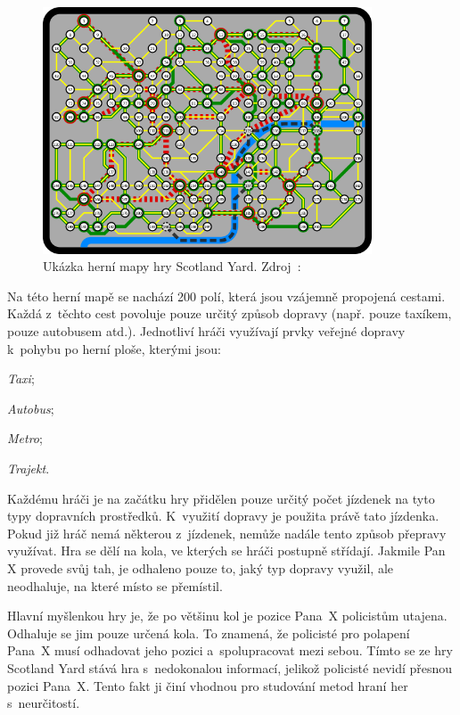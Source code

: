 \begin{figure}[H]
	\centering
	\includegraphics[width=0.87\textwidth]{obrazky-figures/scotland_original}
	\caption{Ukázka herní mapy hry Scotland Yard.
  Zdroj~\cite{scotland_original_image}:}\label{fig:figure}
\end{figure}
\newpage

Na této herní mapě se nachází 200 polí, která jsou vzájemně propojená cestami.
Každá z~těchto cest povoluje pouze určitý způsob dopravy (např.
pouze taxíkem, pouze autobusem atd.).
Jednotliví hráči využívají prvky veřejné dopravy k~pohybu po herní ploše, kterými jsou:

\begin{myitemize}
  \item \emph{Taxi};
  \item \emph{Autobus};
  \item \emph{Metro};
  \item \emph{Trajekt}.
\end{myitemize}

Každému hráči je na začátku hry přidělen pouze určitý počet jízdenek na tyto typy dopravních prostředků.
K~využití dopravy je použita právě tato jízdenka.
Pokud již hráč nemá některou z~jízdenek, nemůže nadále tento způsob přepravy využívat.
Hra se dělí na kola, ve kterých se hráči postupně střídají.
Jakmile Pan X provede svůj tah, je odhaleno pouze to, jaký typ dopravy využil, ale neodhaluje, na které místo se přemístil.

Hlavní myšlenkou hry je, že po většinu kol je pozice Pana~X policistům utajena.
Odhaluje se jim pouze určená kola.
To znamená, že policisté pro polapení Pana~X musí odhadovat jeho pozici a~spolupracovat mezi sebou.
Tímto se ze hry Scotland Yard stává hra s~nedokonalou informací, jelikož policisté nevidí přesnou pozici Pana~X\@.
Tento fakt ji činí vhodnou pro studování metod hraní her s~neurčitostí.

